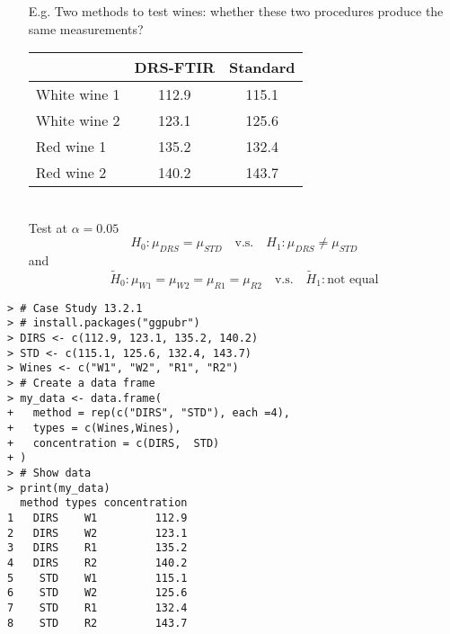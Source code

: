 \begin{frame}[fragile]

\begin{enumerate}
	\item[E.g.] Two methods to test wines: whether these two procedures produce the same measurements?
		\vfill
	\item[]
		\begin{center}
			\begin{tabular}{l|cc}
				& DRS-FTIR & Standard \\
				\hline
				White wine 1 & 112.9 & 115.1  \\
				White wine 2 & 123.1 & 125.6  \\
				Red wine 1 &   135.2 & 132.4  \\
				Red wine 2 &   140.2 & 143.7
				\\
\hline
			\end{tabular}
			\\
			\vfill
			Test at $\alpha=0.05$
			\[
				H_0: \mu_{DRS} = \mu_{STD}\quad\text{v.s.}\quad H_1: \mu_{DRS} \ne \mu_{STD}
			\]
and
			\[
				\widetilde H_0: \mu_{W1} = \mu_{W2}=\mu_{R1} = \mu_{R2}\quad\text{v.s.}\quad \widetilde H_1: \text{not equal}
			\]
		\end{center}
\end{enumerate}

\end{frame}
\begin{frame}[fragile]
	\begin{center}
	\begin{minipage}{0.48\textwidth}
	\begin{lstlisting}
> # Case Study 13.2.1
> # install.packages("ggpubr")
> DIRS <- c(112.9, 123.1, 135.2, 140.2)
> STD <- c(115.1, 125.6, 132.4, 143.7)
> Wines <- c("W1", "W2", "R1", "R2")
> # Create a data frame
> my_data <- data.frame(
+   method = rep(c("DIRS", "STD"), each =4),
+   types = c(Wines,Wines),
+   concentration = c(DIRS,  STD)
+ )
> # Show data
> print(my_data)
  method types concentration
1   DIRS    W1         112.9
2   DIRS    W2         123.1
3   DIRS    R1         135.2
4   DIRS    R2         140.2
5    STD    W1         115.1
6    STD    W2         125.6
7    STD    R1         132.4
8    STD    R2         143.7
	\end{lstlisting}
	\end{minipage}
	\end{center}
\end{frame}
